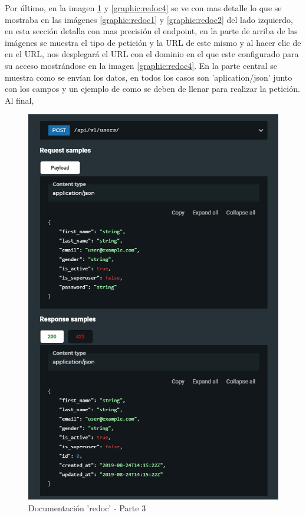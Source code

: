 Por último, en la imagen \ref{graphic:redoc3} y \ref{graphic:redoc4} se ve con mas detalle lo que se mostraba en las imágenes \ref{graphic:redoc1} y \ref{graphic:redoc2} del lado izquierdo, en esta sección detalla con mas precisión el endpoint, en la parte de arriba de las imágenes se muestra el tipo de petición y la URL de este mismo y al hacer clic de en el URL, nos desplegará el URL con el dominio en el que este configurado para su acceso mostrándose en la imagen \ref{graphic:redoc4}. En la parte central se muestra como se envían los datos, en todos los casos son 'aplication/json' junto con los campos y un ejemplo de como se deben de llenar para realizar la petición. Al final,

\begin{figure}[!htb]
    \centering
    \includegraphics[scale=.40]{TT/img/implementacion/redoc_3.png}
    \caption{Documentación 'redoc' - Parte 3}
    \label{graphic:redoc3}
\end{figure}


